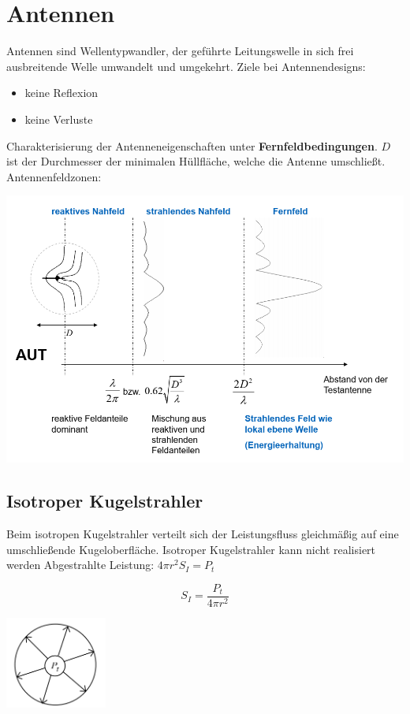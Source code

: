 \documentclass[english]{latex4ei/latex4ei_sheet}
\begin{document}
\section{Antennen}
\begin{sectionbox}
    Antennen sind Wellentypwandler, der geführte Leitungswelle in sich frei ausbreitende Welle umwandelt und umgekehrt.
    Ziele bei Antennendesigns:
    \begin{itemize}
        \item keine Reflexion
        \item keine Verluste
    \end{itemize}
    Charakterisierung der Antenneneigenschaften unter \textbf{Fernfeldbedingungen}.
    $D$ ist der Durchmesser der minimalen Hüllfläche, welche die Antenne umschließt.
    Antennenfeldzonen:
    \begin{center}\includegraphics[width = \textwidth]{./img/antennen_feldzonen.png}
    \end{center}
    \subsection{Isotroper Kugelstrahler}
    Beim isotropen Kugelstrahler verteilt sich der Leistungsfluss gleichmäßig auf eine umschließende Kugeloberfläche.
    Isotroper Kugelstrahler kann nicht realisiert werden
    Abgestrahlte Leistung: $4\pi r^2 S_I = P_t$

    $$S_I = \frac{P_t}{4\pi r^2}$$

    \begin{center}\includegraphics[width = 0.25\textwidth]{./img/antennen_isotroper_strahler.png}
    \end{center}

\end{sectionbox}
\end{document}

